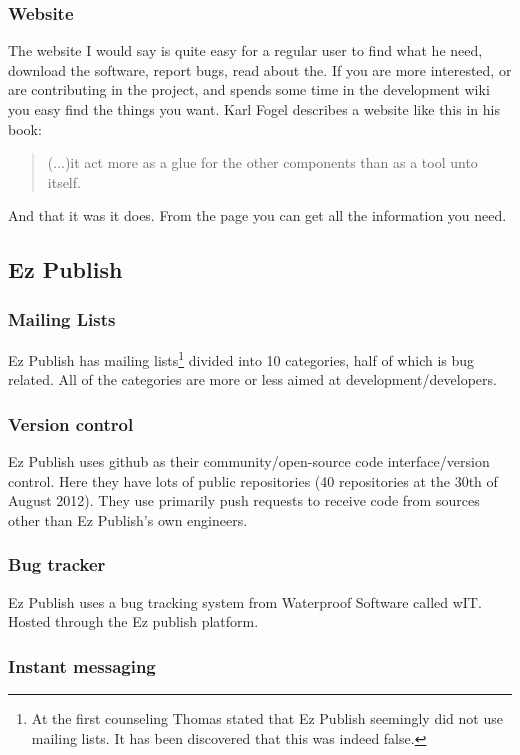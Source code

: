 \documentclass{report} %
\begin{document}
\subsubsection{Website}
The website I would say is quite easy for a regular user to find what he need, download the software, report bugs, read about the. If you are more interested, or are contributing in the project, and spends some time in the development wiki\cite{mpcwiki} you easy find the things you want. Karl Fogel describes a website like this in his book:\begin{quotation}
(...)it act more as a glue for the other components than as a tool unto itself.\cite{kfposs}
\end{quotation} 
And that it was it does. From the page you can get all the information you need.
\subsection{Ez Publish}
\subsubsection{Mailing Lists}
Ez Publish has mailing lists\cite{ezpubwebmaillists}\footnote{At the first counseling Thomas stated that Ez Publish seemingly did not use mailing lists. It has been discovered that this was indeed false.} divided into 10 categories, half of which is bug related. All of the categories are more or less aimed at development/developers.
\subsubsection{Version control}
Ez Publish uses github\cite{ezpubgithub} as their community/open-source code interface/version control. Here they have lots of public repositories (40 repositories at the 30th of August 2012). They use primarily push requests to receive code from sources other than Ez Publish's own engineers. %
\subsubsection{Bug tracker}
Ez Publish uses a bug tracking system from Waterproof Software\cite{waterproofweb} called wIT\cite{waterproofwebwit}. Hosted through the Ez publish platform.
\subsubsection{Instant messaging} %
\end{document}
